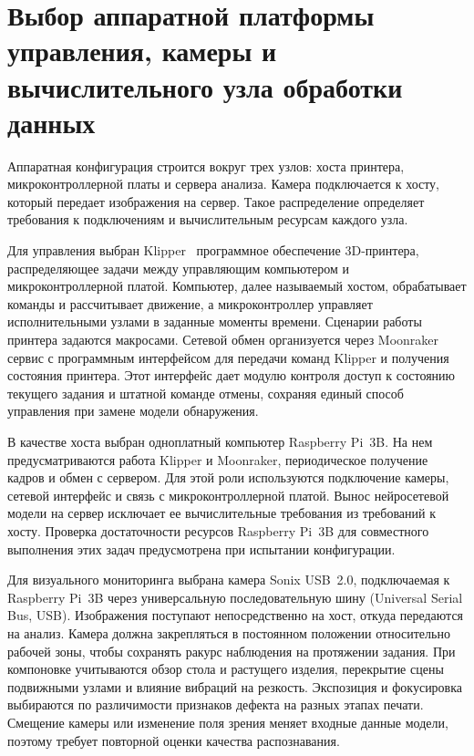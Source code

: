 \section{Выбор аппаратной платформы управления, камеры и вычислительного узла обработки данных}

Аппаратная конфигурация строится вокруг трех узлов: хоста принтера, микроконтроллерной платы и сервера анализа. Камера подключается к хосту, который передает изображения на сервер. Такое распределение определяет требования к подключениям и вычислительным ресурсам каждого узла.

Для управления выбран Klipper~\textemdash{} программное обеспечение 3D-принтера, распределяющее задачи между управляющим компьютером и микроконтроллерной платой. Компьютер, далее называемый хостом, обрабатывает команды и рассчитывает движение, а микроконтроллер управляет исполнительными узлами в заданные моменты времени. Сценарии работы принтера задаются макросами. Сетевой обмен организуется через Moonraker~\textemdash{} сервис с программным интерфейсом для передачи команд Klipper и получения состояния принтера. Этот интерфейс дает модулю контроля доступ к состоянию текущего задания и штатной команде отмены, сохраняя единый способ управления при замене модели обнаружения.

В качестве хоста выбран одноплатный компьютер Raspberry Pi~3B. На нем предусматриваются работа Klipper и Moonraker, периодическое получение кадров и обмен с сервером. Для этой роли используются подключение камеры, сетевой интерфейс и связь с микроконтроллерной платой. Вынос нейросетевой модели на сервер исключает ее вычислительные требования из требований к хосту. Проверка достаточности ресурсов Raspberry Pi~3B для совместного выполнения этих задач предусмотрена при испытании конфигурации.

Для визуального мониторинга выбрана камера Sonix USB~2.0, подключаемая к Raspberry Pi~3B через универсальную последовательную шину (Universal Serial Bus, USB). Изображения поступают непосредственно на хост, откуда передаются на анализ. Камера должна закрепляться в постоянном положении относительно рабочей зоны, чтобы сохранять ракурс наблюдения на протяжении задания. При компоновке учитываются обзор стола и растущего изделия, перекрытие сцены подвижными узлами и влияние вибраций на резкость. Экспозиция и фокусировка выбираются по различимости признаков дефекта на разных этапах печати. Смещение камеры или изменение поля зрения меняет входные данные модели, поэтому требует повторной оценки качества распознавания.

